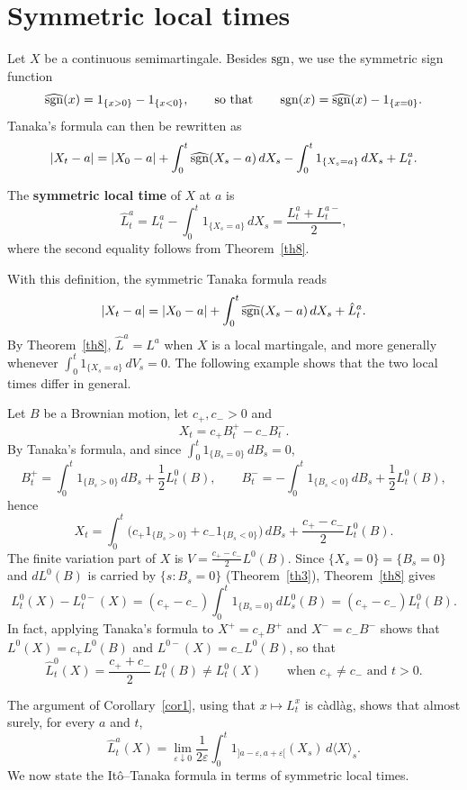 \section{Symmetric local times}

Let $X$ be a continuous semimartingale. Besides $\operatorname{sgn}$, we use the symmetric
sign function
\[
	\widehat{\operatorname{sgn}}(x)=1_{\{x>0\}}-1_{\{x < 0\}}, \qquad\text{so that}\qquad
	\operatorname{sgn}(x) = \widehat{\operatorname{sgn}}(x) - 1_{\{x=0\}} .
\]
Tanaka's formula can then be rewritten as
\[
	|X_t - a| =|X_0 - a| + \int_0^t \widehat{\operatorname{sgn}}( X_s - a)\, dX_s
	- \int_0^t 1_{\{X_s = a \}}\,dX_s + L_t^a .
\]
\begin{definition}\label{def:symlocaltime}
	The \textbf{symmetric local time} of $X$ at $a$ is
	\[
		\hat{L}_t^a = L_t^a - \int_0^t 1_{\{X_s = a \}}\,dX_s
		= \frac{L^a_t + L^{a-}_t}{2},
	\]
	where the second equality follows from Theorem~\ref{th8}.
\end{definition}
With this definition, the symmetric Tanaka formula reads
\[
	|X_t - a| =|X_0 - a| + \int_0^t \widehat{\operatorname{sgn}}( X_s - a)\, dX_s + \hat{L}_t^a .
\]
By Theorem~\ref{th8}, $\hat{L}^a = L^a$ when $X$ is a local martingale, and more
generally whenever $\int_0^t 1_{\{X_s=a\}}\,dV_s = 0$. The following example shows
that the two local times differ in general.

\begin{example}\label{ex:twosided}
	Let $B$ be a Brownian motion, let $c_+, c_- > 0$ and
	\[
		X_t=c_+ B_t^+ - c_- B_t^- .
	\]
	By Tanaka's formula, and since $\int_0^t 1_{\{B_s=0\}}\,dB_s =0$,
	\[
		B_t^+ = \int_0^t 1_{\{B_s >0 \}}\,dB_s + \frac{1}{2} L_t^0(B),
		\qquad
		B_t^- = -\int_0^t 1_{\{B_s <0 \}}\,dB_s + \frac{1}{2} L_t^0(B),
	\]
	hence
	\[
		X_t = \int_0^t \big(c_+1_{\{B_s >0 \}} + c_- 1_{\{B_s <0 \}}\big)\,dB_s
		+ \frac{c_+-c_-}{2} L_t^0 (B) .
	\]
	The finite variation part of $X$ is $V=\frac{c_+-c_-}{2} L^0 (B)$. Since
	$\{X_s =0 \}=\{B_s =0 \}$ and $dL^0(B)$ is carried by $\{s : B_s = 0\}$
	(Theorem~\ref{th3}), Theorem~\ref{th8} gives
	\[
		L_t^0 (X) - L_t^{0-} (X) = (c_+-c_-) \int_0^t 1_{\{B_s =0 \}}\,dL_s^0 (B) = (c_+-c_-) L_t^0 (B) .
	\]
	In fact, applying Tanaka's formula to $X^+ = c_+B^+$ and $X^- = c_-B^-$
	shows that $L^0(X) = c_+ L^0(B)$ and $L^{0-}(X) = c_- L^0(B)$, so that
	\[
		\hat{L}_t^0(X) = \frac{c_+ + c_-}{2}\, L_t^0(B) \neq L_t^0(X)
		\qquad\text{when } c_+ \neq c_- \text{ and } t > 0.
	\]
\end{example}

The argument of Corollary~\ref{cor1}, using that $x\mapsto L^x_t$ is càdlàg,
shows that almost surely, for every $a$ and $t$,
\[
	\hat{L} _t^a(X)=\lim_{\varepsilon \downarrow 0} \frac{1}{2\varepsilon}
	\int_0^t 1_{]a-\varepsilon , a+\varepsilon[}(X_s)\,d\langle X\rangle_s .
\]
We now state the It\^o--Tanaka formula in terms of symmetric local times.


